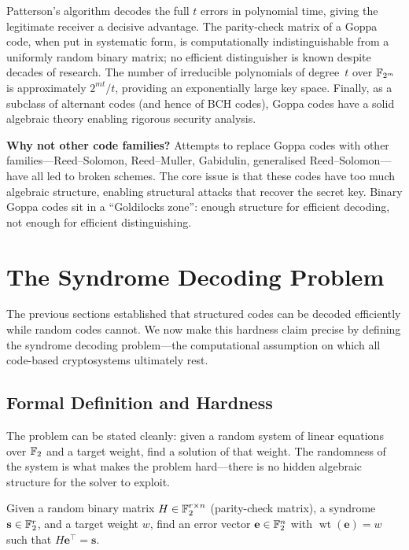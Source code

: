 Patterson's algorithm decodes the full $t$ errors in polynomial time, giving the legitimate receiver a decisive advantage.  The parity-check matrix of a Goppa code, when put in systematic form, is computationally indistinguishable from a uniformly random binary matrix; no efficient distinguisher is known despite decades of research.  The number of irreducible polynomials of degree~$t$ over $\mathbb{F}_{2^m}$ is approximately $2^{mt}/t$, providing an exponentially large key space.  Finally, as a subclass of alternant codes (and hence of BCH codes), Goppa codes have a solid algebraic theory enabling rigorous security analysis.

\begin{svgraybox}
\textbf{Why not other code families?}
Attempts to replace Goppa codes with other families---Reed--Solomon, Reed--Muller, Gabidulin, generalised Reed--Solomon---have all led to broken schemes.  The core issue is that these codes have too much algebraic structure, enabling structural attacks that recover the secret key.  Binary Goppa codes sit in a ``Goldilocks zone'': enough structure for efficient decoding, not enough for efficient distinguishing.
\end{svgraybox}


\section{The Syndrome Decoding Problem}
\label{sec:syndrome-decoding}

The previous sections established that structured codes can be decoded efficiently while random codes cannot.  We now make this hardness claim precise by defining the syndrome decoding problem---the computational assumption on which all code-based cryptosystems ultimately rest.

\subsection{Formal Definition and Hardness}
\label{subsec:sdp-definition}

The problem can be stated cleanly: given a random system of linear equations over $\mathbb{F}_2$ and a target weight, find a solution of that weight.  The randomness of the system is what makes the problem hard---there is no hidden algebraic structure for the solver to exploit.

\begin{definition}
\label{def:sdp}
Given a random binary matrix $H \in \mathbb{F}_2^{r \times n}$ (parity-check matrix), a syndrome $\mathbf{s} \in \mathbb{F}_2^r$, and a target weight $w$, find an error vector $\mathbf{e} \in \mathbb{F}_2^n$ with $\operatorname{wt}(\mathbf{e}) = w$ such that $H\mathbf{e}^\top = \mathbf{s}$.
\end{definition}

